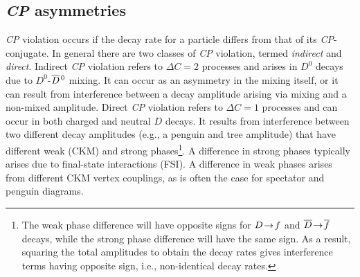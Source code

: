\subsection{\emph{CP} asymmetries}\label{sec:cp_asym}

\emph{CP} violation occurs if the decay rate for a particle differs 
from that of its \emph{CP}-conjugate\cite{Bigi:2000yz}. 
In general there are two classes of \emph{CP} violation, termed
{\it indirect\/} and {\it direct\/}\cite{Nir:1999mg}. Indirect \emph{CP} 
violation refers to $\Delta C\!=\!2$ processes and 
arises in $D^0$ decays due to $D^0$-$\overline{D}{}^{\,0}$ mixing. 
It can occur as an asymmetry in the mixing itself, or it can 
result from interference between a decay 
amplitude arising via mixing and a non-mixed amplitude. 
Direct \emph{CP} violation refers to $\Delta C\!=\!1$
processes and can occur in both charged and neutral 
$D$ decays. It results from interference between two different decay
amplitudes (e.g., a penguin and tree amplitude) that have
different weak (CKM) and strong phases\footnote{The weak 
phase difference will have opposite signs for $D\!\rightarrow\! f$ and 
$\overline{D}\ra\bar{f}$ decays, while the strong phase difference 
will have the same sign. As a result, squaring the total amplitudes 
to obtain the decay rates gives interference terms having 
opposite sign, i.e., non-identical decay rates.}.
A difference in strong phases typically arises due to 
final-state interactions (FSI)\cite{Buccella:1994nf}. A difference
in weak phases arises from different CKM vertex couplings, as 
is often the case for spectator and penguin diagrams.

